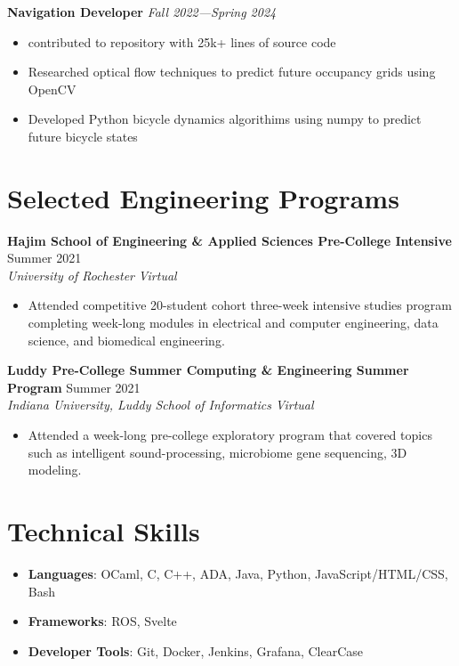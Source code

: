 \documentclass[letterpaper,10pt]{article}
\newcommand{\position}[2]{
    \vspace{4pt}
    \normalsize \textbf {#1}
    \hfill {\small \textit{#2}}
    \\
}
\newcommand{\resumeEntry}[4]{
    \vspace{4pt}
    \large \textbf{#1}
    \normalsize \hfill #2
    \\
    \textit{#3} \hfill \textit{#4}
    \vspace{1pt}
}
\newcommand{\itemsBegin}{
    \begin{itemize}[leftmargin=0.2in, labelsep=0.05in, itemsep=0pt, parsep=1pt, topsep=0pt, partopsep=0pt]
}
\newcommand{\itemsEnd}{\end{itemize}}
\begin{document}
    \position{Navigation Developer}{Fall 2022---Spring 2024}
    \itemsBegin{}
        \item contributed to repository with 25k+ lines of source code
        \item Researched optical flow techniques to predict future occupancy grids using OpenCV
        \item Developed Python bicycle dynamics algorithims using numpy to predict future bicycle states
    \itemsEnd{}

\section{Selected Engineering Programs}


    \resumeEntry{Hajim School of Engineering \& Applied Sciences Pre-College Intensive}
        {Summer 2021}
        {University of Rochester}
        {Virtual}

    \itemsBegin{}
        \item Attended competitive 20-student cohort three-week intensive studies program completing week-long modules in electrical and computer engineering, data science, and biomedical engineering.
    \itemsEnd{}

    \resumeEntry{Luddy Pre-College Summer Computing \& Engineering Summer Program}
        {Summer 2021}
        {Indiana University, Luddy School of Informatics}
        {Virtual}

    \itemsBegin{}
        \item Attended a week-long pre-college exploratory program that covered topics such as intelligent sound-processing, microbiome gene sequencing, 3D modeling.
    \itemsEnd{}

\section{Technical Skills}

    \itemsBegin{}
        \item \textbf{Languages}{: OCaml, C, C++, ADA, Java, Python, JavaScript/HTML/CSS, Bash}
        \item \textbf{Frameworks}{: ROS, Svelte}
        \item \textbf{Developer Tools}{: Git, Docker, Jenkins, Grafana, ClearCase}
    \itemsEnd{}
\end{document}

